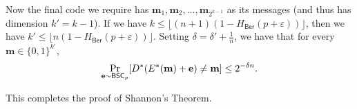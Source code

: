 \vspace{2mm}
Now the final code we require has $\textbf{m}_1,\textbf{m}_2,\ldots, \textbf{m}_{2^{k-1}}$ as its messages (and thus has dimension $k'=k-1$). If we have $k\leq \lfloor(n+1)(1-H_\mathsf{Ber}(p+\varepsilon))\rfloor$, then we have
$k'\leq \lfloor n(1-H_\mathsf{Ber}(p+\varepsilon))\rfloor$. Setting $\delta=\delta'+\frac{1}{n}$, we have that for every $\textbf{m}\in \{0,1\}^{k'}$,
$$\Pr_{\textbf{e}\sim\mathsf{BSC}_p}[D^*(E^*(\textbf{m})+\textbf{e})\neq \textbf{m}]\leq 2^{-\delta n}.$$

\vspace{2mm}
This completes the proof of Shannon's Theorem.